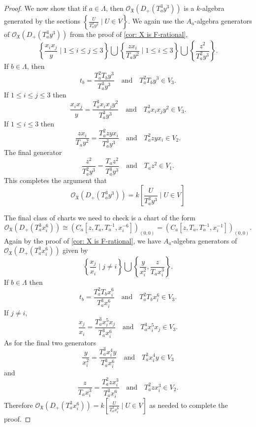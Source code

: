 \documentclass[10pt,a4paper]{amsart}
\newcommand{\cO}{\mathcal{O}}
\begin{document}
\begin{proof}
    We now show that if $a\in \Lambda$, then $\cO_{\mathfrak{X}}(D_+(T_a^3y^3))$ is a $k$-algebra generated by the sections $\left\{\frac{U}{T_a^3y^3}\mid U\in V\right\}$. We again use the $A_a$-algebra generators of $\cO_{\mathfrak{X}}(D_+(T_a^3y^3))$ from the proof of \cref{cor: X is F-rational}, 
    \[
    \left\{\frac{x_ix_j}{y}\mid 1\leq i\leq j\leq3\right\}\bigcup \left\{\frac{zx_i}{T_ay^2}\mid 1\leq i\leq 3\right\} \bigcup \left\{\frac{z^2}{T_a^2y^3}\right\}.
    \]
    If $b\in\Lambda$, then
    \[
    t_b = \frac{T_a^2T_by^3}{T_a^3y^3}\quad\mbox{and}\quad T_a^2T_by^3\in V_3.
    \]
    If $1\leq i\leq j\leq 3$ then
    \[
    \frac{x_ix_j}{y} = \frac{T_a^3x_ix_jy^2}{T_a^3y^3}\quad\mbox{and}\quad T_a^3x_ix_jy^2\in V_3.
    \]
    If $1\leq i\leq 3$ then
    \[
    \frac{zx_i}{T_ay^2} = \frac{T_a^2zyx_i}{T_a^3y^3}\quad \mbox{and}\quad T_a^2zyx_i\in V_2.
    \]
    The final generator
    \[
    \frac{z^2}{T_a^2y^3} = \frac{T_az^2}{T_a^3y^3}\quad\mbox{and}\quad T_az^2\in V_1.
    \]
    This completes the argument that
    \[
    \cO_\mathfrak{X}(D_+(T_a^3y^3)) = k\left[\frac{U}{T_a^3y^3}\mid U\in V\right]
    \]

    The final class of charts we need to check is a chart of the form 
    \[
    \cO_\mathfrak{X}(D_+(T_a^3x_i^6)) \cong \left(C_a\left[z, T_a,T_a^{-1},x_i^{-6}\right]\right)_{(0,0)} = \left(C_a\left[z, T_a,T_a^{-1},x_i^{-1}\right]\right)_{(0,0)}.
    \]
    Again by the proof of \cref{cor: X is F-rational}, we have $A_a$-algebra generators of $\cO_\mathfrak{X}(D_+(T_a^3x_i^6))$ given by
    \[
    \left\{\frac{x_j}{x_i}\mid j\not=i\right\}\bigcup\left\{\frac{y}{x_i^2}, \frac{z}{T_ax_i^3}\right\}.
    \]
    If $b\in\Lambda$ then
    \[
    t_b = \frac{T_a^2T_bx_i^6}{T_a^3x_i^6}\quad\mbox{and}\quad T_a^2T_bx_i^6\in V_3.
    \]
    If $j\not=i$,
    \[
    \frac{x_j}{x_i} = \frac{T_a^3x_i^5x_j}{T_a^3x_i^6}\quad\mbox{and}\quad T_a^3x_i^5x_j\in V_3.
    \]
    As for the final two generators
    \[
    \frac{y}{x_i^2} = \frac{T_a^3x_i^4y}{T_a^3x_i^6}\quad\mbox{and}\quad T_a^3x_i^4y\in V_3
    \]
    and
    \[
    \frac{z}{T_ax_i^3} = \frac{T_a^2zx_i^3}{T_a^3x_i^6}\quad\mbox{and}\quad T_a^2zx_i^3\in V_2.
    \]
    Therefore $\cO_\mathfrak{X}(D_+(T_a^3x_i^6)) = k\left[\frac{U}{T_a^3x_i^6}\mid U\in V\right]$ as needed to complete the proof.  
\end{proof}
\end{document}
